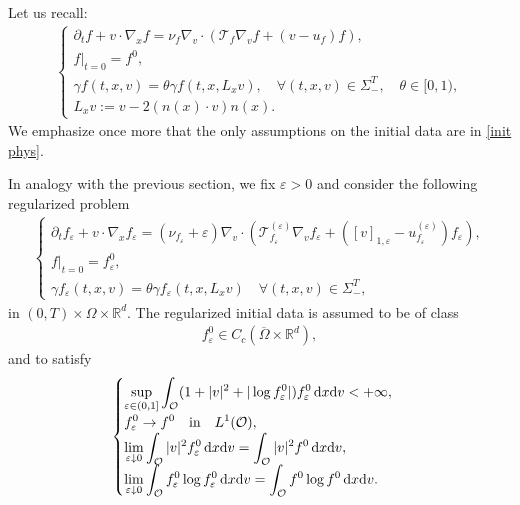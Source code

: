 \documentclass[10pt, reqno]{amsart}
\theoremstyle{plain}
\theoremstyle{definition}
\theoremstyle{remark}
\numberwithin{equation}{section}
\newcommand{\calO}{\mathcal O}
\newcommand{\calT}{\mathcal T}
\newcommand{\p}{\partial}
\newcommand{\R}{\mathbb{R}}
\newcommand{\ve}{\varepsilon}
\newcommand{\dx}{\textnormal{d}x}
\newcommand{\dv}{\textnormal{d}v}
\newcommand{\lt}{\left}
\newcommand{\rt}{\right}
\newcommand{\renorm}[3]{\lt[#1\rt]_{#2 , #3}}
\begin{document}
 Let us recall:
\begin{align*}
    \begin{cases}
        \p_t f + v\cdot \nabla_x f = \nu_f \nabla_v\cdot \lt( \calT_f \nabla_v f + (v - u_f) f \rt), \\
        f|_{t=0} = f^0, \\
        \gamma f(t,x,v) = \theta \gamma f(t,x,L_xv), \quad \forall (t,x,v)\in \Sigma_-^T, \quad \theta\in [0,1),\\
        L_xv := v - 2(n(x)\cdot v) n(x).
    \end{cases}
\end{align*}
We emphasize once more that the only assumptions on the initial data are in \eqref{init phys}.

In analogy with the previous section, we fix $\ve>0$ and consider the following regularized problem
\begin{align} \label{spec: eq: reg}
    \begin{cases}
        \p_t f_\ve + v\cdot \nabla_x f_\ve = (\nu_{f_\ve} + \ve) \nabla_v \cdot \lt(\calT_{f_\ve}^{(\ve)} \nabla_v f_\ve + ( \renorm{v}{1}{\ve} - u_{f_\ve}^{(\ve)}) f_\ve \rt), \\
        f|_{t=0} = f_\ve^0, \\
        \gamma f_\ve(t,x,v) = \theta \gamma f_\ve(t,x,L_x v) \quad \forall (t,x,v)\in \Sigma_-^T,
    \end{cases}
\end{align}
in $(0,T)\times \Omega \times \R^d$. The regularized initial data is assumed to be of class
\begin{align*}
    f_\ve^0 \in C_c(\overline{\Omega}\times \R^d),
\end{align*}
and to satisfy
\begin{align*}
\begin{cases}
    \displaystyle\sup_{\ve\in (0,1]} \int_{\calO} (1+|v|^2 + |\log f_\ve^0|) f_\ve^0 \, \dx\dv < + \infty, \\
    \displaystyle f_\ve^0 \to f^0 \quad \text{in} \quad L^1(\calO),\\
    \displaystyle \lim_{\ve\downarrow 0} \int_{\calO} |v|^2 f_\ve^0 \,\dx\dv = \int_{\calO} |v|^2 f^0 \,\dx\dv, \\
    \displaystyle \lim_{\ve\downarrow 0} \int_{\calO} f_\ve^0 \log f_\ve^0 \,\dx\dv = \int_{\calO} f^0 \log f^0 \,\dx\dv.
\end{cases}
\end{align*}
\end{document}
